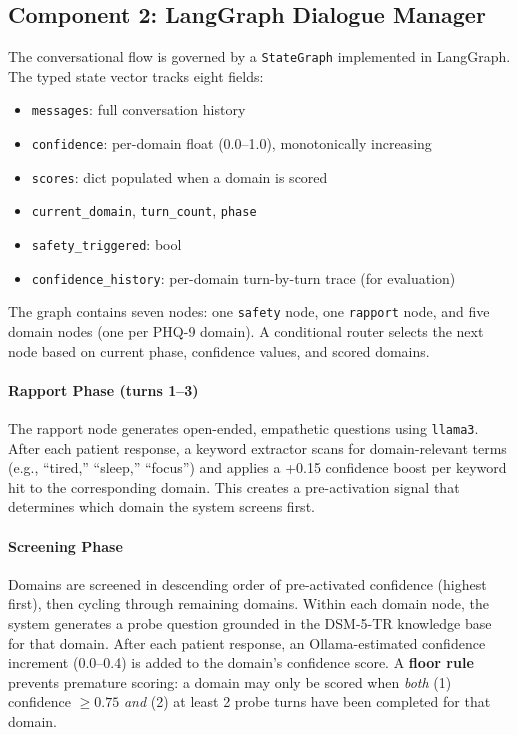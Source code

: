 \documentclass[11pt,twocolumn]{article}
\begin{document}
\subsection{Component 2: LangGraph Dialogue Manager}

The conversational flow is governed by a \texttt{StateGraph} implemented in LangGraph. The typed state vector tracks eight fields:

\begin{itemize}
  \item \texttt{messages}: full conversation history
  \item \texttt{confidence}: per-domain float (0.0--1.0), monotonically increasing
  \item \texttt{scores}: dict populated when a domain is scored
  \item \texttt{current\_domain}, \texttt{turn\_count}, \texttt{phase}
  \item \texttt{safety\_triggered}: bool
  \item \texttt{confidence\_history}: per-domain turn-by-turn trace (for evaluation)
\end{itemize}

The graph contains seven nodes: one \texttt{safety} node, one \texttt{rapport} node, and five domain nodes (one per PHQ-9 domain). A conditional router selects the next node based on current phase, confidence values, and scored domains.

\paragraph{Rapport Phase (turns 1--3)} The rapport node generates open-ended, empathetic questions using \texttt{llama3}. After each patient response, a keyword extractor scans for domain-relevant terms (e.g., ``tired,'' ``sleep,'' ``focus'') and applies a +0.15 confidence boost per keyword hit to the corresponding domain. This creates a pre-activation signal that determines which domain the system screens first.

\paragraph{Screening Phase} Domains are screened in descending order of pre-activated confidence (highest first), then cycling through remaining domains. Within each domain node, the system generates a probe question grounded in the DSM-5-TR knowledge base for that domain. After each patient response, an Ollama-estimated confidence increment (0.0--0.4) is added to the domain's confidence score. A \textbf{floor rule} prevents premature scoring: a domain may only be scored when \emph{both} (1) confidence $\geq 0.75$ \emph{and} (2) at least 2 probe turns have been completed for that domain.
\end{document}

